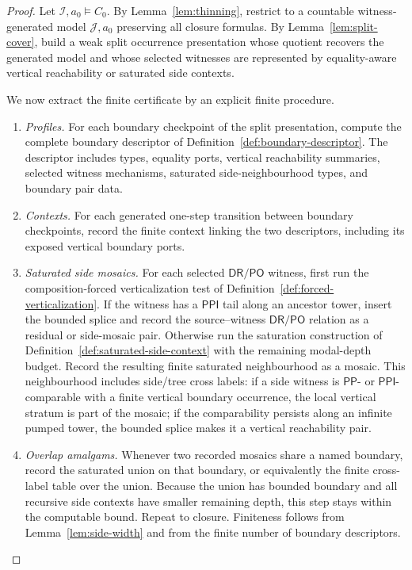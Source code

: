\documentclass[11pt]{article}
\newcommand{\DR}{\mathsf{DR}}
\newcommand{\PO}{\mathsf{PO}}
\newcommand{\PP}{\mathsf{PP}}
\newcommand{\PPI}{\mathsf{PPI}}
\newcommand{\I}{\mathcal I}
\newcommand{\J}{\mathcal J}
\begin{document}
\begin{proof}
Let $\I,a_0\models C_0$.  By Lemma~\ref{lem:thinning}, restrict to a countable witness-generated model $\J,a_0$ preserving all closure formulas.  By Lemma~\ref{lem:split-cover}, build a weak split occurrence presentation whose quotient recovers the generated model and whose selected witnesses are represented by equality-aware vertical reachability or saturated side contexts.

We now extract the finite certificate by an explicit finite procedure.
\begin{enumerate}[label=(E\arabic*)]
\item \emph{Profiles.}  For each boundary checkpoint of the split presentation, compute the complete boundary descriptor of Definition~\ref{def:boundary-descriptor}.  The descriptor includes types, equality ports, vertical reachability summaries, selected witness mechanisms, saturated side-neighbourhood types, and boundary pair data.
\item \emph{Contexts.}  For each generated one-step transition between boundary checkpoints, record the finite context linking the two descriptors, including its exposed vertical boundary ports.
\item \emph{Saturated side mosaics.}  For each selected $\DR/\PO$ witness, first run the composition-forced verticalization test of Definition~\ref{def:forced-verticalization}.  If the witness has a $\PPI$ tail along an ancestor tower, insert the bounded splice and record the source--witness $\DR/\PO$ relation as a residual or side-mosaic pair.  Otherwise run the saturation construction of Definition~\ref{def:saturated-side-context} with the remaining modal-depth budget.  Record the resulting finite saturated neighbourhood as a mosaic.  This neighbourhood includes side/tree cross labels: if a side witness is $\PP$- or $\PPI$-comparable with a finite vertical boundary occurrence, the local vertical stratum is part of the mosaic; if the comparability persists along an infinite pumped tower, the bounded splice makes it a vertical reachability pair.
\item \emph{Overlap amalgams.}  Whenever two recorded mosaics share a named boundary, record the saturated union on that boundary, or equivalently the finite cross-label table over the union.  Because the union has bounded boundary and all recursive side contexts have smaller remaining depth, this step stays within the computable bound.  Repeat to closure.  Finiteness follows from Lemma~\ref{lem:side-width} and from the finite number of boundary descriptors.

\end{enumerate}
\end{proof}
\end{document}
